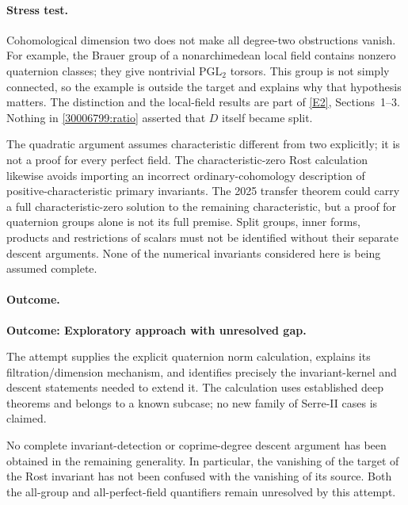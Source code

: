 \documentclass[11pt,a4paper]{article}
\newcommand{\eref}[2]{\hyperlink{extra:#1:#2}{[E#2]}}
\numberwithin{equation}{section}
\begin{document}
\paragraph{Stress test.}
Cohomological dimension two does not make all degree-two obstructions
vanish. For example, the Brauer group of a nonarchimedean local field
contains nonzero quaternion classes; they give nontrivial
$\mathrm{PGL}_2$ torsors. This group is not simply connected, so the
example is outside the target and explains why that hypothesis matters.
The distinction and the local-field results are part of
\eref{30006799}{2}, Sections~1--3. Nothing in \eqref{30006799:ratio} asserted that
$D$ itself became split.

The quadratic argument assumes characteristic different from two
explicitly; it is not a proof for every perfect field. The
characteristic-zero Rost calculation likewise avoids importing an
incorrect ordinary-cohomology description of positive-characteristic
primary invariants. The 2025 transfer theorem could carry a full
characteristic-zero solution to the remaining characteristic, but a
proof for quaternion groups alone is not its full premise. Split groups,
inner forms, products and restrictions of scalars must not be identified
without their separate descent arguments. None of the numerical
invariants considered here is being assumed complete.

\paragraph{Outcome.}
\textbf{Outcome: Exploratory approach with unresolved gap.}

The attempt supplies the explicit quaternion norm calculation, explains
its filtration/dimension mechanism, and identifies precisely the
invariant-kernel and descent statements needed to extend it. The
calculation uses established deep theorems and belongs to a known
subcase; no new family of Serre-II cases is claimed.

No complete invariant-detection or coprime-degree descent argument has
been obtained in the remaining generality. In particular, the vanishing
of the target of the Rost invariant has not been confused with the
vanishing of its source. Both the all-group and all-perfect-field
quantifiers remain unresolved by this attempt.
\end{document}
